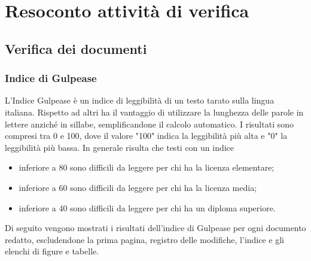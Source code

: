 \section{Resoconto attività di verifica}
\subsection{Verifica dei documenti}
\subsubsection{Indice di Gulpease}
L'Indice Gulpease è un indice di leggibilità di un testo tarato sulla lingua italiana. Rispetto ad altri ha il vantaggio di utilizzare la lunghezza delle parole in lettere anziché in sillabe, semplificandone il calcolo automatico.
I risultati sono compresi tra 0 e 100, dove il valore "100" indica la leggibilità più alta e "0" la leggibilità più bassa. In generale risulta che testi con un indice
\begin{itemize}
    \item inferiore a 80 sono difficili da leggere per chi ha la licenza elementare;
    \item inferiore a 60 sono difficili da leggere per chi ha la licenza media;
    \item inferiore a 40 sono difficili da leggere per chi ha un diploma superiore.
\end{itemize}

Di seguito vengono mostrati i risultati dell’indice di Gulpease per ogni documento redatto, escludendone la prima pagina, registro delle modifiche, l'indice e gli elenchi di figure e tabelle.

